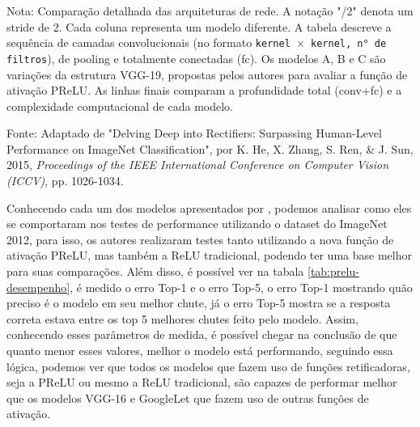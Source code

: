\begin{table}
\begin{threeparttable}
        \begin{tablenotes}[para]
            \small
            \item[] Nota: Comparação detalhada das arquiteturas de rede. A notação "/2" denota um stride de 2. Cada coluna representa um modelo diferente. A tabela descreve a sequência de camadas convolucionais (no formato \texttt{kernel $\times$ kernel, n° de filtros}), de pooling e totalmente conectadas (fc). Os modelos A, B e C são variações da estrutura VGG-19, propostas pelos autores para avaliar a função de ativação PReLU. As linhas finais comparam a profundidade total (conv+fc) e a complexidade computacional de cada modelo.
            \item[] Fonte: Adaptado de "Delving Deep into Rectifiers: Surpassing Human-Level Performance on ImageNet Classification", por K. He, X. Zhang, S. Ren, \& J. Sun, 2015, \textit{Proceedings of the IEEE International Conference on Computer Vision (ICCV)}, pp. 1026-1034.
        \end{tablenotes}
        
    \end{threeparttable}
\end{table}

Conhecendo cada um dos modelos apresentados por \textcite{PReLUArticle}, podemos analisar como eles se comportaram nos testes de performance utilizando o dataset do ImageNet 2012, para isso, os autores realizaram testes tanto utilizando a nova função de ativação PReLU, mas também a ReLU tradicional, podendo ter uma base melhor para suas comparações. Além disso, é possível ver na tabala \ref{tab:prelu-desempenho}, é medido o erro Top-1 e o erro Top-5, o erro Top-1 mostrando quão preciso é o modelo em seu melhor chute, já o erro Top-5 mostra se a resposta correta estava entre os top 5 melhores chutes feito pelo modelo. Assim, conhecendo esses parâmetros de medida, é possível chegar na conclusão de que quanto menor esses valores, melhor o modelo está performando, seguindo essa lógica, podemos ver que todos os modelos que fazem uso de funções retificadoras, seja a PReLU ou mesmo a ReLU tradicional, são capazes de performar melhor que os modelos VGG-16 e GoogleLet que fazem uso de outras funções de ativação.

